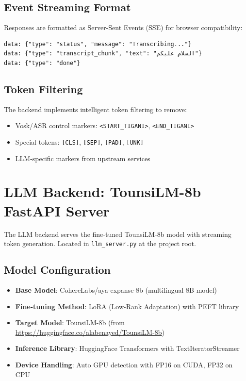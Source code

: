 \documentclass[12pt,a4paper]{report}
\begin{document}
\subsection{Event Streaming Format}

Responses are formatted as Server-Sent Events (SSE) for browser compatibility:

\begin{verbatim}
data: {"type": "status", "message": "Transcribing..."}
data: {"type": "transcript_chunk", "text": "السلام عليكم"}
data: {"type": "done"}
\end{verbatim}

\subsection{Token Filtering}

The backend implements intelligent token filtering to remove:
\begin{itemize}
    \item Vosk/ASR control markers: \texttt{<START\_TIGANI>}, \texttt{<END\_TIGANI>}
    \item Special tokens: \texttt{[CLS]}, \texttt{[SEP]}, \texttt{[PAD]}, \texttt{[UNK]}
    \item LLM-specific markers from upstream services
\end{itemize}

\section{LLM Backend: TounsiLM-8b FastAPI Server}

The LLM backend serves the fine-tuned TounsiLM-8b model with streaming token generation. Located in \texttt{llm\_server.py} at the project root.

\subsection{Model Configuration}

\begin{itemize}
    \item \textbf{Base Model}: CohereLabs/aya-expanse-8b (multilingual 8B model)
    \item \textbf{Fine-tuning Method}: LoRA (Low-Rank Adaptation) with PEFT library
    \item \textbf{Target Model}: TounsiLM-8b (from \url{https://huggingface.co/alabenayed/TounsiLM-8b})
    \item \textbf{Inference Library}: HuggingFace Transformers with TextIteratorStreamer
    \item \textbf{Device Handling}: Auto GPU detection with FP16 on CUDA, FP32 on CPU
\end{itemize}
\end{document}
